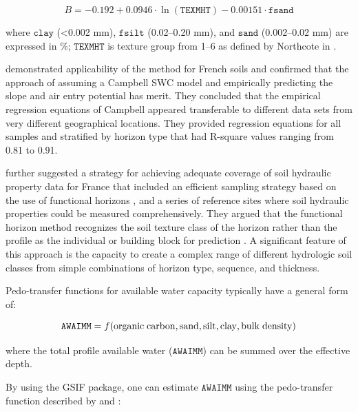 \documentclass[graybox,natbib,nospthms,UStrade]{svmono}
\begin{document}
\begin{equation}
B = -0.192 + 0.0946\cdot \ln({\mathtt{TEXMHT}}) - 0.00151\cdot \mathtt{fsand}
\end{equation}

where \(\mathtt{clay}\) (\textless{}0.002 mm), \(\mathtt{fsilt}\) (0.02--0.20 mm), and
\(\mathtt{sand}\) (0.002--0.02 mm) are expressed in \%; \(\mathtt{TEXMHT}\) is
texture group from 1--6 as defined by Northcote in \citet{peverill1999soil}.

\citet{Cresswell2006SUM} demonstrated applicability of the \citet{Williams1992} method
for French soils and confirmed that the approach of assuming a Campbell
SWC model and empirically predicting the slope and air entry potential
has merit. They concluded that the empirical regression equations of
Campbell appeared transferable to different data sets from very
different geographical locations. They provided regression equations for
all samples and stratified by horizon type that had R-square values ranging
from 0.81 to 0.91.

\citet{Cresswell2006SUM} further suggested a strategy for achieving adequate
coverage of soil hydraulic property data for France that included an
efficient sampling strategy based on the use of functional horizons
\citep{Bouma1989S}, and a series of reference sites where soil hydraulic
properties could be measured comprehensively. They argued that the
functional horizon method recognizes the soil texture class of the
horizon rather than the profile as the individual or building block for
prediction \citep{Wosten1985SSSAJ, Wosten1992}. A significant feature of
this approach is the capacity to create a complex range of different
hydrologic soil classes from simple combinations of horizon type,
sequence, and thickness.

Pedo-transfer functions for available water capacity typically have a
general form of:

\begin{equation}
{\mathtt{AWAIMM}} = f ({\rm organic} \; {\rm carbon}, {\rm sand}, {\rm silt}, {\rm clay},  {\rm bulk} \; {\rm density})
\end{equation}

where the total profile available water (\(\mathtt{AWAIMM}\)) can be
summed over the effective depth.

By using the GSIF package, one can estimate \(\mathtt{AWAIMM}\) using the
pedo-transfer function described by \citet{hodnett2002marked} and
\citet{wosten2013soil}:
\end{document}
